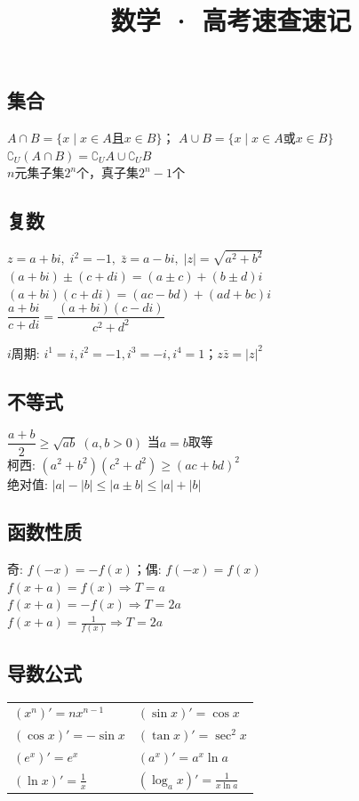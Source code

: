 \documentclass[12pt,a4paper,twocolumn]{ctexart}
\title{\textbf{数学 · 高考速查速记}}
\date{}
\begin{document}
\maketitle

\subsection*{集合}
$A\cap B=\{x\mid x\in A\text{且}x\in B\}$；
$A\cup B=\{x\mid x\in A\text{或}x\in B\}$ \\
$\complement_U(A\cap B)=\complement_U A\cup\complement_U B$ \\
$n$元集子集$2^n$个，真子集$2^n-1$个

\subsection*{复数}
$z=a+bi,\;i^2=-1,\;\bar{z}=a-bi,\;|z|=\sqrt{a^2+b^2}$ \\
$(a+bi)\pm(c+di)=(a\pm c)+(b\pm d)i$ \\
$(a+bi)(c+di)=(ac-bd)+(ad+bc)i$ \\
$\dfrac{a+bi}{c+di}=\dfrac{(a+bi)(c-di)}{c^2+d^2}$
\begin{small}
$i$周期: $i^1=i,i^2=-1,i^3=-i,i^4=1$；$z\bar{z}=|z|^2$
\end{small}

\subsection*{不等式}
$\dfrac{a+b}{2}\ge\sqrt{ab}\;(a,b>0)$ 当$a=b$取等\\
柯西: $(a^2+b^2)(c^2+d^2)\ge(ac+bd)^2$ \\
绝对值: $|a|-|b|\le|a\pm b|\le|a|+|b|$

\subsection*{函数性质}
奇: $f(-x)=-f(x)$；偶: $f(-x)=f(x)$ \\
$f(x+a)=f(x)\Rightarrow T=a$ \\
$f(x+a)=-f(x)\Rightarrow T=2a$ \\
$f(x+a)=\frac1{f(x)}\Rightarrow T=2a$

\subsection*{导数公式}
\begin{tabular}{ll}
$(x^n)'=nx^{n-1}$ & $(\sin x)'=\cos x$ \\
$(\cos x)'=-\sin x$ & $(\tan x)'=\sec^2x$ \\
$(e^x)'=e^x$ & $(a^x)'=a^x\ln a$ \\
$(\ln x)'=\frac1x$ & $(\log_ax)'=\frac1{x\ln a}$
\end{tabular}
\end{document}
